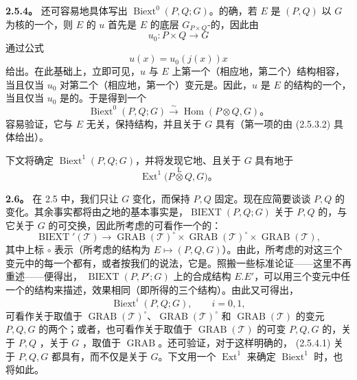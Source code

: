 \textbf{2.5.4。} 还可容易地具体写出 $\operatorname{Biext}^0(P,Q;G)$。的确，若 $E$ 是 $(P,Q)$ 以 $G$ 为核的一个，则 $E$ 的 $u$ 首先是 $E$ 的底层 $G_{P\times Q}$-的，因此由
\[
u_0:P\times Q\longrightarrow G
\]
通过公式
\[
u(x)=u_0(j(x))x
\]
给出。在此基础上，立即可见，$u$ 与 $E$ 上第一个（相应地，第二个）结构相容，当且仅当 $u_0$ 对第二个（相应地，第一个）变元是。因此，$u$ 是 $E$ 的结构的一个，当且仅当 $u_0$ 是的。于是得到一个
\[
\operatorname{Biext}^0(P,Q;G)\xrightarrow{\sim}\operatorname{Hom}(P\otimes Q,G)。\tag{2.5.4.1}
\]
容易验证，它与 $E$ 无关，保持结构，并且关于 $G$ 具有（第一项的由 (2.5.3.2) 具体给出）。

下文将确定 $\operatorname{Biext}^1(P,Q;G)$，并将发现它地、且关于 $G$ 具有地于
\[
\operatorname{Ext}^1\bigl(P\mathbin{\overset{\mathrm L}{\otimes}}Q,G\bigr)。
\]

\textbf{2.6。} 在 2.5 中，我们只让 $G$ 变化，而保持 $P,Q$ 固定。现在应简要谈谈 $P,Q$ 的变化。其余事实都将由之地的基本事实是，$\operatorname{BIEXT}(P,Q;G)$ 关于 $P,Q$ 的，与它关于 $G$ 的可交换，因此所考虑的可看作一个的：
\[
\operatorname{BIEXT}'(\mathcal T)\longrightarrow
\operatorname{GRAB}(\mathcal T)^\circ\times\operatorname{GRAB}(\mathcal T)^\circ\times\operatorname{GRAB}(\mathcal T),\tag{2.6.1}
\]
其中上标 $\circ$ 表示（所考虑的结构为 $E\mapsto(P,Q,G)$）。由此，所考虑的对这三个变元中的每一个都有，或者按我们的说法，它是。照搬一些标准论证——这里不再重述——便得出， $\operatorname{BIEXT}(P,P';G)$ 上的合成结构 $E.E'$，可以用三个变元中任一个的结构来描述，效果相同（即所得的三个结构）。由此又可得出，
\[
\operatorname{Biext}^i(P,Q;G),\qquad i=0,1,\tag{2.6.2}
\]
可看作关于取值于 $\operatorname{GRAB}(\mathcal T)^\circ$、$\operatorname{GRAB}(\mathcal T)^\circ$ 和 $\operatorname{GRAB}(\mathcal T)$ 的变元 $P,Q,G$ 的两个；或者，也可看作关于取值于 $\operatorname{GRAB}(\mathcal T)$ 的可变 $P,Q,G$ 的，关于 $P,Q$ ，关于 $G$ ，取值于 $\operatorname{GRAB}$。还可验证，对于这样明确的， (2.5.4.1) 关于 $P,Q,G$ 都具有，而不仅是关于 $G$。下文用一个 $\operatorname{Ext}^1$ 来确定 $\operatorname{Biext}^1$ 时，也将如此。

